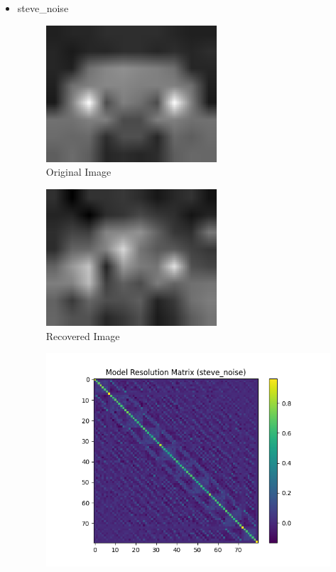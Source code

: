 \documentclass{article}
\begin{document}
\begin{itemize}
        \item steve\_noise
    \begin{figure}[h]
        \centering
        \includegraphics[width=0.6\textwidth]{images/greyscale/steve.png}
        \caption{Original Image}
    \end{figure}
    \begin{figure}[h]
        \centering
        \includegraphics[width=0.6\textwidth]{images/outputs/noise/steve_noise.png}
        \caption{Recovered Image}
    \end{figure}
    \begin{figure}[h]
        \centering
        \includegraphics[width=1\textwidth]{images/outputs/modelres/steve_noise.png}

\end{figure}
\end{itemize}
\end{document}
